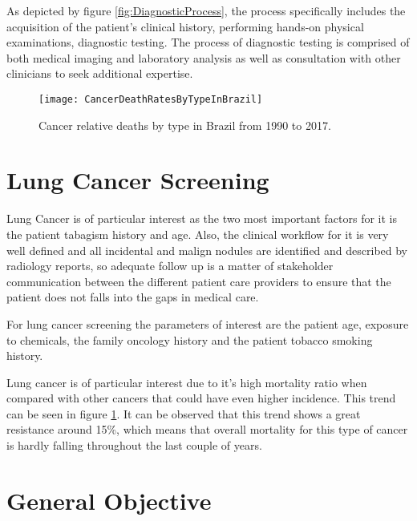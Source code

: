 As depicted by figure \ref{fig:DiagnosticProcess}, the process specifically includes the acquisition of the patient’s clinical history, performing hands-on physical examinations, diagnostic testing. The process of diagnostic testing is comprised of both medical imaging and laboratory analysis as well as consultation with other clinicians to seek additional expertise.

\begin{figure}
\begin{centering}
\texttt{[image: CancerDeathRatesByTypeInBrazil]}
\par\end{centering}
\caption{\label{fig:cancer_deaths_in_brazil}Cancer relative deaths by type in Brazil from 1990 to 2017.}

\end{figure}

\section{Lung Cancer Screening}

Lung Cancer is of particular interest as the two most important factors for it is the patient tabagism history and age\cite{fleischner2017}. Also, the clinical workflow for it is very well defined and all incidental and malign nodules are identified and described by radiology reports, so adequate follow up is a matter of stakeholder communication between the different patient care providers to ensure that the patient does not falls into the gaps in medical care. 

For lung cancer screening the parameters of interest are the patient age, exposure to chemicals, the family oncology history and the patient tobacco smoking history\cite{fleischner2017, parasuraman2000, jaklitsch2012}.

Lung cancer is of particular interest due to it's high mortality ratio when compared with other cancers that could have even higher incidence. This trend can be seen in figure \ref{fig:cancer_deaths_in_brazil}. It can be observed that this trend shows a great resistance around 15\%, which means that overall mortality for this type of cancer is hardly falling throughout the last couple of years.

\section{General Objective}

